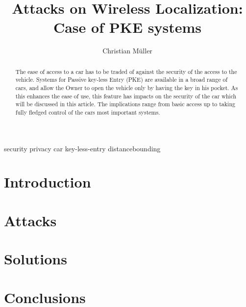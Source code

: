 \documentclass[draft,a4paper]{IEEEtran}
\title{Attacks on Wireless Localization:\\Case of PKE systems}
\author{Christian Müller}
\begin{document}
\maketitle
\begin{IEEEkeywords}
security privacy car key-less-entry distancebounding
\end{IEEEkeywords}


\begin{abstract}
The ease of access to a car has to be traded of against the security of the
access to the vehicle.
Systems for Passive key-less Entry (PKE) are available in a broad range of cars,
and allow the Owner to open the vehicle only by having the key in his pocket.
As this enhances the ease of use, this feature has impacts on the security of
the car which will be discussed in this article. The implications range from 
basic access up to taking fully fledged control of the cars most important
systems.
\end{abstract}

\section{Introduction}
	

\section{Attacks}
	

\section{Solutions}


\section{Conclusions}

\newpage
\nocite{*}


\end{document}
